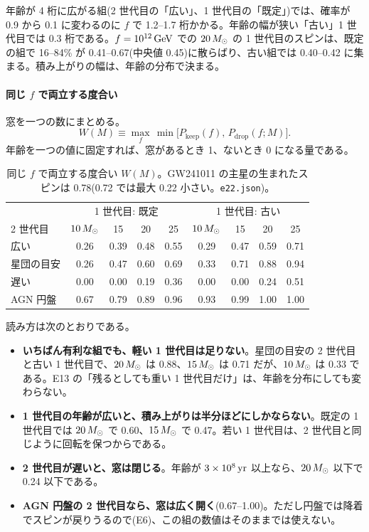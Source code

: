 年齢が 4 桁に広がる組(2 世代目の「広い」、1 世代目の「既定」)では、確率が 0.9 から 0.1 に変わるのに $f$ で 1.2--1.7 桁かかる。年齢の幅が狭い「古い」1 世代目では 0.3 桁である。$f=10^{12}\,\mathrm{GeV}$ での $20\,M_\odot$ の 1 世代目のスピンは、既定の組で 16--84\% が 0.41--0.67(中央値 0.45)に散らばり、古い組では 0.40--0.42 に集まる。積み上がりの幅は、年齢の分布で決まる。

\paragraph{同じ $f$ で両立する度合い}
窓を一つの数にまとめる。
\begin{equation}
W(M)\equiv\max_f\,\min\bigl[P_\mathrm{keep}(f),\,P_\mathrm{drop}(f;M)\bigr].
\end{equation}
年齢を一つの値に固定すれば、窓があるとき 1、ないとき 0 になる量である。

\begin{table}[H]
\centering\small
\begin{tabular}{lcccc@{\qquad}cccc}
\toprule
 & \multicolumn{4}{c}{1 世代目: 既定} & \multicolumn{4}{c}{1 世代目: 古い}\\
2 世代目 & $10\,M_\odot$ & 15 & 20 & 25 & $10\,M_\odot$ & 15 & 20 & 25\\
\midrule
広い & 0.26 & 0.39 & 0.48 & 0.55 & 0.29 & 0.47 & 0.59 & 0.71\\
星団の目安 & 0.26 & 0.47 & 0.60 & 0.69 & 0.33 & 0.71 & 0.88 & 0.94\\
遅い & 0.00 & 0.00 & 0.19 & 0.36 & 0.00 & 0.00 & 0.24 & 0.51\\
AGN 円盤 & 0.67 & 0.79 & 0.89 & 0.96 & 0.93 & 0.99 & 1.00 & 1.00\\
\bottomrule
\end{tabular}
\caption{同じ $f$ で両立する度合い $W(M)$。GW241011 の主星の生まれたスピンは 0.78(0.72 では最大 0.22 小さい。\texttt{e22.json})。}
\label{tab:e22W}
\end{table}

読み方は次のとおりである。
\begin{itemize}
\item \textbf{いちばん有利な組でも、軽い 1 世代目は足りない}。星団の目安の 2 世代目と古い 1 世代目で、$20\,M_\odot$ は 0.88、$15\,M_\odot$ は 0.71 だが、$10\,M_\odot$ は 0.33 である。E13 の「残るとしても重い 1 世代目だけ」は、年齢を分布にしても変わらない。
\item \textbf{1 世代目の年齢が広いと、積み上がりは半分ほどにしかならない}。既定の 1 世代目では $20\,M_\odot$ で 0.60、$15\,M_\odot$ で 0.47。若い 1 世代目は、2 世代目と同じように回転を保つからである。
\item \textbf{2 世代目が遅いと、窓は閉じる}。年齢が $3\times10^8\,\mathrm{yr}$ 以上なら、$20\,M_\odot$ 以下で 0.24 以下である。
\item \textbf{AGN 円盤の 2 世代目なら、窓は広く開く}(0.67--1.00)。ただし円盤では降着でスピンが戻りうるので(E6)、この組の数値はそのままでは使えない。
\end{itemize}

